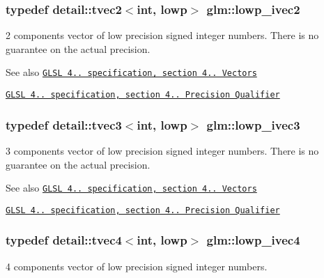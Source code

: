 \subsubsection[{\texorpdfstring{lowp\+\_\+ivec2}{lowp_ivec2}}]{\setlength{\rightskip}{0pt plus 5cm}typedef detail\+::tvec2$<$int, lowp$>$ {\bf glm\+::lowp\+\_\+ivec2}}\hypertarget{group__core__precision_ga562c5c67d6431ab88fc4a032239e2137}{}\label{group__core__precision_ga562c5c67d6431ab88fc4a032239e2137}
2 components vector of low precision signed integer numbers. There is no guarantee on the actual precision.

\begin{DoxySeeAlso}{See also}
\href{http://www.opengl.org/registry/doc/GLSLangSpec.4.20.8.pdf}{\tt G\+L\+SL 4.. specification, section 4.. Vectors} 

\href{http://www.opengl.org/registry/doc/GLSLangSpec.4.20.8.pdf}{\tt G\+L\+SL 4.. specification, section 4.. Precision Qualifier} 
\end{DoxySeeAlso}
\subsubsection[{\texorpdfstring{lowp\+\_\+ivec3}{lowp_ivec3}}]{\setlength{\rightskip}{0pt plus 5cm}typedef detail\+::tvec3$<$int, lowp$>$ {\bf glm\+::lowp\+\_\+ivec3}}\hypertarget{group__core__precision_gad133fec5c629e3f712c1270e15144e6c}{}\label{group__core__precision_gad133fec5c629e3f712c1270e15144e6c}
3 components vector of low precision signed integer numbers. There is no guarantee on the actual precision.

\begin{DoxySeeAlso}{See also}
\href{http://www.opengl.org/registry/doc/GLSLangSpec.4.20.8.pdf}{\tt G\+L\+SL 4.. specification, section 4.. Vectors} 

\href{http://www.opengl.org/registry/doc/GLSLangSpec.4.20.8.pdf}{\tt G\+L\+SL 4.. specification, section 4.. Precision Qualifier} 
\end{DoxySeeAlso}
\subsubsection[{\texorpdfstring{lowp\+\_\+ivec4}{lowp_ivec4}}]{\setlength{\rightskip}{0pt plus 5cm}typedef detail\+::tvec4$<$int, lowp$>$ {\bf glm\+::lowp\+\_\+ivec4}}\hypertarget{group__core__precision_gab9b404ae623385d5094499d2d4e4616d}{}\label{group__core__precision_gab9b404ae623385d5094499d2d4e4616d}
4 components vector of low precision signed integer numbers.


